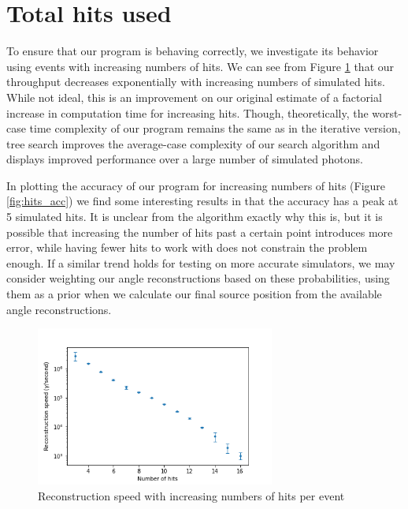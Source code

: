 
\section{Total hits used}
\label{totalhits}
To ensure that our program is behaving correctly, we investigate its behavior using events with increasing numbers of hits. We can see from Figure \ref{fig:hits_speed} that our throughput decreases exponentially with increasing numbers of simulated hits. While not ideal, this is an improvement on our original estimate of a factorial increase in computation time for increasing hits. Though, theoretically, the worst-case time complexity of our program remains the same as in the iterative version, tree search improves the average-case complexity of our search algorithm and displays improved performance over a large number of simulated photons.

In plotting the accuracy of our program for increasing numbers of hits (Figure \ref{fig:hits_acc}) we find some interesting results in that the accuracy has a peak at 5 simulated hits. It is unclear from the algorithm exactly why this is, but it is possible that increasing the number of hits past a certain point introduces more error, while having fewer hits to work with does not constrain the problem enough. If a similar trend holds for testing on more accurate simulators, we may consider weighting our angle reconstructions based on these probabilities, using them as a prior when we calculate our final source position from the available angle reconstructions.

\begin{figure}
    \centering
    \includegraphics[width=0.7\textwidth]{graphs/pi_hits_speed.png}
    \caption{Reconstruction speed with increasing numbers of hits per event}
    \label{fig:hits_speed}
\end{figure}

